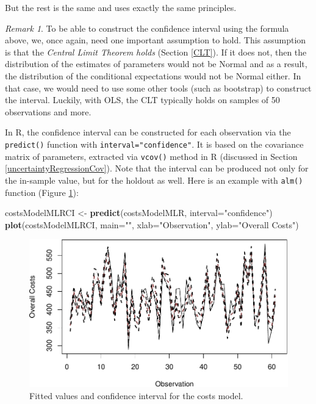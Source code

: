 \documentclass[
]{book}
\newenvironment{Shaded}{\begin{snugshade}}{\end{snugshade}}
\newcommand{\AttributeTok}[1]{\textcolor[rgb]{0.13,0.29,0.53}{#1}}
\newcommand{\FunctionTok}[1]{\textcolor[rgb]{0.13,0.29,0.53}{\textbf{#1}}}
\newcommand{\NormalTok}[1]{#1}
\newcommand{\OtherTok}[1]{\textcolor[rgb]{0.56,0.35,0.01}{#1}}
\newcommand{\StringTok}[1]{\textcolor[rgb]{0.31,0.60,0.02}{#1}}
\theoremstyle{definition}
\theoremstyle{definition}
\theoremstyle{definition}
\theoremstyle{definition}
\theoremstyle{remark}
\newtheorem*{remark}{Remark}
\begin{document}
But the rest is the same and uses exactly the same principles.

\begin{remark}
To be able to construct the confidence interval using the formula above, we, once again, need one important assumption to hold. This assumption is that the \emph{Central Limit Theorem holds} (Section \ref{CLT}). If it does not, then the distribution of the estimates of parameters would not be Normal and as a result, the distribution of the conditional expectations would not be Normal either. In that case, we would need to use some other tools (such as bootstrap) to construct the interval. Luckily, with OLS, the CLT typically holds on samples of 50 observations and more.
\end{remark}

In R, the confidence interval can be constructed for each observation via the \texttt{predict()} function with \texttt{interval="confidence"}. It is based on the covariance matrix of parameters, extracted via \texttt{vcov()} method in R (discussed in Section \ref{uncertaintyRegressionCov}). Note that the interval can be produced not only for the in-sample value, but for the holdout as well. Here is an example with \texttt{alm()} function (Figure \ref{fig:costModelConfidenceInterval}):

\begin{Shaded}
\begin{Highlighting}[]
\NormalTok{costsModelMLRCI }\OtherTok{\textless{}{-}} \FunctionTok{predict}\NormalTok{(costsModelMLR, }\AttributeTok{interval=}\StringTok{"confidence"}\NormalTok{)}
\FunctionTok{plot}\NormalTok{(costsModelMLRCI, }\AttributeTok{main=}\StringTok{""}\NormalTok{,}
     \AttributeTok{xlab=}\StringTok{"Observation"}\NormalTok{, }\AttributeTok{ylab=}\StringTok{"Overall Costs"}\NormalTok{)}
\end{Highlighting}
\end{Shaded}

\begin{figure}
\centering
\includegraphics{Svetunkov---Statistics-for-Business-Analytics_files/figure-latex/costModelConfidenceInterval-1.pdf}
\caption{\label{fig:costModelConfidenceInterval}Fitted values and confidence interval for the costs model.}
\end{figure}
\end{document}
